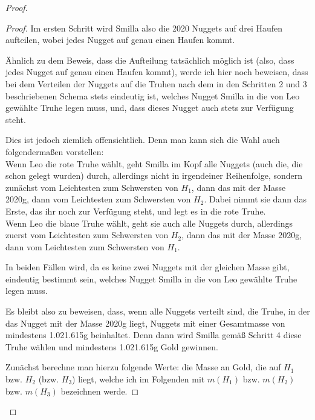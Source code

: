 \begin{proof}
\begin{proof}
        Im ersten Schritt wird Smilla also die 2020 Nuggets auf drei Haufen aufteilen, wobei jedes Nugget auf genau 
        einen Haufen kommt.
        
        Ähnlich zu dem Beweis, dass die Aufteilung tatsächlich möglich ist (also, dass jedes Nugget auf genau 
        einen Haufen kommt), werde ich hier noch beweisen, dass bei dem Verteilen der Nuggets auf die 
        Truhen nach dem in den Schritten 2 und 3 beschriebenen Schema stets eindeutig ist, welches Nugget Smilla in 
        die von Leo gewählte Truhe legen muss, und, dass dieses Nugget auch stets zur Verfügung steht.

        Dies ist jedoch ziemlich offensichtlich. Denn man kann sich die Wahl auch folgendermaßen vorstellen:\\
        Wenn Leo die rote Truhe wählt, geht Smilla im Kopf alle Nuggets (auch die, die schon gelegt wurden) durch, 
        allerdings nicht in irgendeiner Reihenfolge, sondern zunächst vom Leichtesten zum Schwersten von $H_1$, 
        dann das mit der Masse 2020g, dann vom Leichtesten zum Schwersten von $H_2$. Dabei nimmt sie dann das Erste, 
        das ihr noch zur Verfügung steht, und legt es in die rote Truhe. \\
        Wenn Leo die blaue Truhe wählt, geht sie auch alle Nuggets durch, allerdings zuerst vom Leichtesten zum 
        Schwersten von $H_2$, dann das mit der Masse 2020g, dann vom Leichtesten zum Schwersten von $H_1$.

        In beiden Fällen wird, da es keine zwei Nuggets mit der gleichen Masse gibt, eindeutig bestimmt sein, welches 
        Nugget Smilla in die von Leo gewählte Truhe legen muss.

        Es bleibt also zu beweisen, dass, wenn alle Nuggets verteilt sind, die Truhe, in der das Nugget mit der Masse 
        2020g liegt, Nuggets mit einer Gesamtmasse von mindestens 1.021.615g beinhaltet. Denn dann wird Smilla gemäß 
        Schritt 4 diese Truhe wählen und mindestens 1.021.615g Gold gewinnen.

        Zunächst berechne man hierzu folgende Werte: die Masse an Gold, die auf $H_1$ bzw. $H_2$ (bzw. $H_3$) liegt, 
        welche ich im Folgenden mit $m(H_1)$ bzw. $m(H_2)$ bzw. $m(H_3)$ bezeichnen werde.


\end{proof}
\end{proof}

